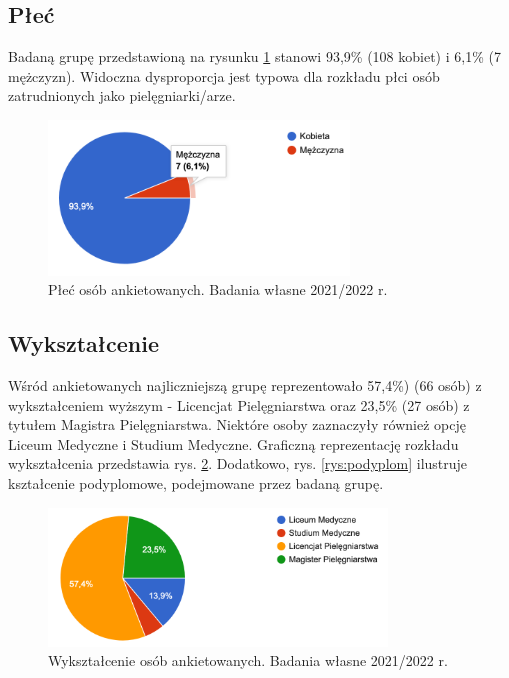 \documentclass[a4paper,12pt,twoside,openany]{report}
\begin{document}
\subsection*{Płeć}

Badaną grupę przedstawioną  na rysunku \ref{rys:plec} stanowi  93,9\%  (108 kobiet) i  6,1\%  (7 mężczyzn). Widoczna dysproporcja jest typowa dla rozkładu płci osób zatrudnionych jako pielęgniarki/arze.

\begin{figure}[h]
\includegraphics[width=8cm]{char_gr_bad/plec00}
\caption{Płeć osób ankietowanych. Badania własne 2021/2022 r.}
\label{rys:plec}
\end{figure}


\subsection*{Wykształcenie}


Wśród ankietowanych najliczniejszą grupę reprezentowało 57,4\%) (66 osób) z wykształceniem wyższym - Licencjat Pielęgniarstwa oraz  23,5\%  (27 osób) z tytułem Magistra Pielęgniarstwa. Niektóre osoby zaznaczyły również opcję Liceum Medyczne i  Studium Medyczne. Graficzną reprezentację rozkładu wykształcenia przedstawia rys. \ref{rys:wykszt}. Dodatkowo, rys. \ref{rys:podyplom} ilustruje kształcenie podyplomowe, podejmowane przez badaną grupę.


\begin{figure}[h]
\includegraphics[width=9cm]{char_gr_bad/wyksztalc00}
\caption{Wykształcenie osób ankietowanych. Badania własne 2021/2022 r.}
\label{rys:wykszt}
\end{figure}
\end{document}
